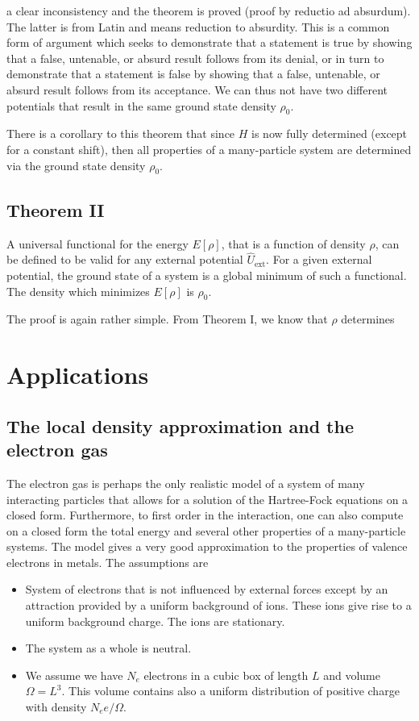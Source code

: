 a clear  inconsistency and the theorem is proved (proof by reductio ad absurdum).
The latter is from Latin and means reduction to absurdity. This is a common form of argument 
which seeks to demonstrate that a statement is true by showing that a false, untenable, or absurd result follows from 
its denial, or in turn to demonstrate that a statement is false by 
showing that a false, untenable, or absurd result follows from its acceptance. We can thus not have two different potentials that result in the same ground state density $\rho_0$.

There is a corollary  to this theorem that since $H$ is now fully determined (except for a constant shift), then all properties of a many-particle system are determined via the ground state density $\rho_0$.  
\subsection{Theorem II}
A universal functional for the energy $E[\rho]$, that is a function of density $\rho$, can be defined to be valid for any external potential  $\hat{U}_{\mathrm{ext}}$. For a given external potential, the ground state of a system is a global
minimum of such a functional. The density which minimizes $E[\rho]$ is $\rho_0$.  

The proof is again rather simple. From Theorem I, we know that $\rho$ determines 
\section{Applications}

\subsection{The local density approximation and the electron gas}
The electron gas is perhaps the only realistic model of a 
system of many interacting particles that allows for a solution
of the Hartree-Fock equations on a closed form. Furthermore, to first order in the interaction, one can also
compute on a closed form the total energy and several other properties of a many-particle systems. 
The model gives a very good approximation to the properties of valence electrons in metals.
The assumptions are
\begin{itemize}
\item System of electrons that is not influenced by external forces except by an attraction provided by a uniform background of ions. These ions give rise to a uniform background charge. The ions are stationary.
\item The system as a whole is neutral.
\item We assume we have $N_e$ electrons in a cubic box of length $L$ and volume $\Omega=L^3$. This volume contains also a
uniform distribution of positive charge with density $N_ee/\Omega$. 
\end{itemize}

